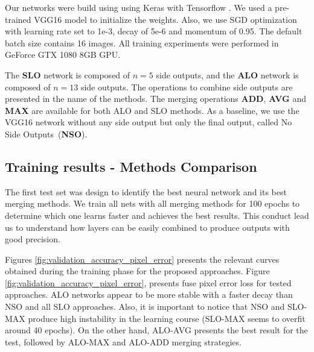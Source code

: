 Our networks were build using using Keras \cite{chollet2015keras} with Tensorflow \cite{tensorflow2015-whitepaper}. We used a pre-trained VGG16 model to initialize the weights. Also, we use SGD optimization with learning rate set to 1e-3, decay of 5e-6 and momentum of 0.95. The default batch size contains 16 images. All training experiments were performed in GeForce GTX 1080 8GB GPU.

The \textbf{SLO} network is composed of $n=5$ side outputs, and the \textbf{ALO} network is composed of $n=13$ side outputs. 
The operations to combine side outputs are presented in the name of the methods. The merging operations \textbf{ADD}, \textbf{AVG} and \textbf{MAX} are available for both ALO and SLO methods.
As a baseline, we use the VGG16 network without any side output but only the final output, called No Side Outputs~(\textbf{NSO}).



\subsection{Training results - Methods Comparison}

The first test set was design to identify the best neural network and its best merging methods. We train all nets with all merging methods for 100 epochs to determine which one learns faster and achieves the best results. This conduct lead us to understand how layers can be easily combined to produce outputs with good precision.

Figures \ref{fig:validation_accuracy_pixel_error} presents the relevant curves obtained during the training phase for the proposed approaches. Figure \ref{fig:validation_accuracy_pixel_error}, presents fuse pixel error loss for tested approaches. ALO networks appear to be more stable with a faster decay than NSO and all SLO approaches. Also, it is important to notice that NSO and SLO-MAX produce high instability in the learning course (SLO-MAX seems to overfit around 40 epochs). On the other hand, ALO-AVG presents the best result for the test, followed by ALO-MAX and ALO-ADD merging strategies.

